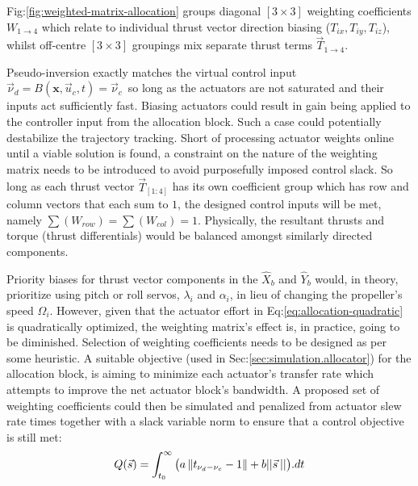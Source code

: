 \par
Fig:\ref{fig:weighted-matrix-allocation} groups diagonal $[3\times 3]$ weighting coefficients $W_{1\rightarrow 4}$ which relate to individual thrust vector direction biasing ($T_{ix},T_{iy},T_{iz}$), whilst off-centre $[3\times 3]$ groupings mix separate thrust terms $\vec{T}_{1\rightarrow 4}$. 
\par
Pseudo-inversion exactly matches the virtual control input $\vec{\nu}_d=B(\mathbf{x},\vec{u}_c,t)=\vec{\nu}_c$~so long as the actuators are not saturated and their inputs act sufficiently fast. Biasing actuators could result in gain being applied to the controller input from the allocation block. Such a case could potentially destabilize the trajectory tracking. Short of processing actuator weights online until a viable solution is found, a constraint on the nature of the weighting matrix needs to be introduced to avoid purposefully imposed control slack. So long as each thrust vector $\vec{T}_{[1:4]}$ has its own coefficient group which has row and column vectors that each sum to $1$, the designed control inputs will be met, namely $\sum (W_{row})=\sum (W_{col}) = 1$. Physically, the resultant thrusts and torque (thrust differentials) would be balanced amongst similarly directed components. 
\par
Priority biases for thrust vector components in the $\hat{X}_{b}$ and $\hat{Y}_{b}$ would, in theory, prioritize using pitch or roll servos, $\lambda_i$ and $\alpha_i$, in lieu of changing the propeller's speed $\Omega_i$. However, given that the actuator effort in Eq:\ref{eq:allocation-quadratic} is quadratically optimized, the weighting matrix's effect is, in practice, going to be diminished. Selection of weighting coefficients needs to be designed as per some heuristic. A suitable objective (used in Sec:\ref{sec:simulation.allocator}) for the allocation block, is aiming to minimize each actuator's transfer rate which attempts to improve the net actuator block's bandwidth. A proposed set of weighting coefficients could then be simulated and penalized from actuator slew rate times together with a slack variable norm to ensure that a control objective is still met:
\begin{equation}\label{eq:actuator-penalty}
Q(\vec{s})=\int_{t_0}^{\infty} \big(a\left\lVert t_{\nu_d-\nu_c}-1\right\rVert+b||\vec{s}\hspace{2pt}||\big).dt
\end{equation}
